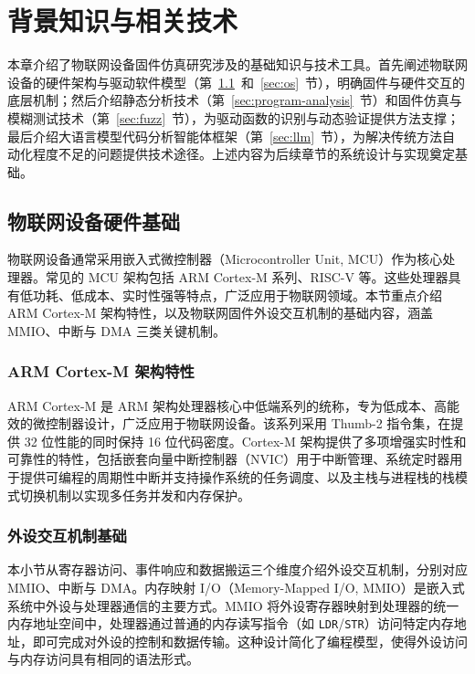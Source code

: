 \chapter{背景知识与相关技术}
\label{chap:background}

本章介绍了物联网设备固件仿真研究涉及的基础知识与技术工具。首先阐述物联网设备的硬件架构与驱动软件模型（第~\ref{sec:hw}~和~\ref{sec:os}~节），明确固件与硬件交互的底层机制；然后介绍静态分析技术（第~\ref{sec:program-analysis}~节）和固件仿真与模糊测试技术（第~\ref{sec:fuzz}~节），为驱动函数的识别与动态验证提供方法支撑；最后介绍大语言模型代码分析智能体框架（第~\ref{sec:llm}~节），为解决传统方法自动化程度不足的问题提供技术途径。上述内容为后续章节的系统设计与实现奠定基础。

\section{物联网设备硬件基础}
\label{sec:hw}

物联网设备通常采用嵌入式微控制器（Microcontroller Unit, MCU）作为核心处理器。常见的 MCU 架构包括 ARM Cortex-M 系列、RISC-V 等。这些处理器具有低功耗、低成本、实时性强等特点，广泛应用于物联网领域。本节重点介绍 ARM Cortex-M 架构特性，以及物联网固件外设交互机制的基础内容，涵盖 MMIO、中断与 DMA 三类关键机制。

\subsection{ARM Cortex-M 架构特性}
\label{sec:cortex_m}
ARM Cortex-M 是 ARM 架构处理器核心中低端系列的统称，专为低成本、高能效的微控制器设计，广泛应用于物联网设备。该系列采用 Thumb-2 指令集，在提供 32 位性能的同时保持 16 位代码密度。Cortex-M 架构提供了多项增强实时性和可靠性的特性，包括嵌套向量中断控制器（NVIC）用于中断管理、系统定时器用于提供可编程的周期性中断并支持操作系统的任务调度、以及主栈与进程栈的栈模式切换机制以实现多任务并发和内存保护。
\subsection{外设交互机制基础}
\label{sec:mmio}

本小节从寄存器访问、事件响应和数据搬运三个维度介绍外设交互机制，分别对应 MMIO、中断与 DMA。内存映射 I/O（Memory-Mapped I/O, MMIO）是嵌入式系统中外设与处理器通信的主要方式。MMIO 将外设寄存器映射到处理器的统一内存地址空间中，处理器通过普通的内存读写指令（如 \texttt{LDR}/\texttt{STR}）访问特定内存地址，即可完成对外设的控制和数据传输。这种设计简化了编程模型，使得外设访问与内存访问具有相同的语法形式。

